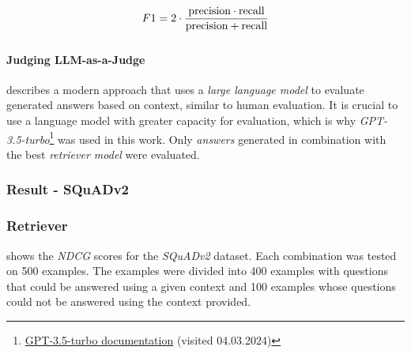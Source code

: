 \documentclass{article}
\begin{document}
\begin{align}
\begin{split}
	F1 &= 2\cdot \frac{\text{precision}\cdot\text{recall}}{\text{precision} + \text{recall}}\\[0.25\baselineskip]
\end{split}
\end{align}

\paragraph{Judging LLM-as-a-Judge}
\cite{judge} describes a modern approach that uses a \textit{large language model} to evaluate generated answers based on context, similar to human evaluation. It is crucial to use a language model with greater capacity for evaluation, which is why \textit{GPT-3.5-turbo}\footnote{\href{https://platform.openai.com/docs/models/gpt-3-5-turbo}{GPT-3.5-turbo documentation} (visited 04.03.2024)} was used in this work. Only \textit{answers} generated in combination with the best \textit{retriever model} were evaluated.

\subsubsection{Result - SQuADv2}\label{Squadv2Results}

\subsubsection*{Retriever}
 shows the \textit{NDCG} scores for the \textit{SQuADv2} dataset. Each combination was tested on 500 examples. The examples were divided into 400 examples with questions that could be answered using a given context and 100 examples whose questions could not be answered using the context provided.
\end{document}
